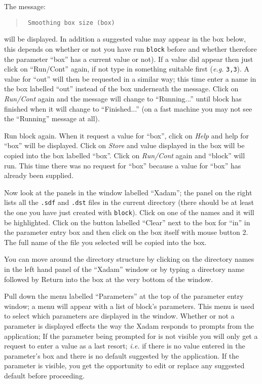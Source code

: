 \begin{list}{
}{\setlength{\rightmargin}{\leftmargin}}
The message:
\begin{quote}\tt
Smoothing box size (box)
\end{quote}

will be displayed. In addition a suggested value may appear in the box
below, this depends on whether or not you have run {\tt block} before
and whether therefore the parameter ``box'' has a current value or
not). If a value did appear then just click on ``Run/Cont'' again, if
not type in something suitable first ({\em e.g.}\/ {\tt 3,3}).  A
value for ``out'' will then be requested in a similar way; this time
enter a name in the box labelled ``out'' instead of the box underneath
the message. Click on {\em Run/Cont} again and the message will change
to ``Running...'' until block has finished when it will change to
``Finished...'' (on a fast machine you may not see the ``Running''
message at all).

\item Run block again. When it request a value for ``box'', click on
{\em Help} and help for ``box'' will be displayed. Click on {\em Store}
and value displayed in the box will be copied into the box labelled
``box''.  Click on {\em Run/Cont} again and ``block'' will run. This
time there was no request for ``box'' because a value for ``box'' has
already been supplied.

\item Now look at the panels in the window labelled ``Xadam''; the
panel on the right lists all the {\tt .sdf} and {\tt .dst} files in the
current directory (there should be at least the one you have just
created with {\tt block}).  Click on one of the names and it will be
highlighted.  Click on the button labelled ``Clear'' next to the box
for ``in'' in the parameter entry box and then click on the box itself
with mouse button 2. The full name of the file you selected will be
copied into the box.

You can move around the directory structure by clicking on the
directory names in the left hand panel of the ``Xadam'' window or by
typing a directory name followed by Return into the box at the very
bottom of the window.

\item Pull down the menu labelled ``Parameters'' at the top of the
parameter entry window; a menu will appear with a list of block's
parameters.  This menu is used to select which parameters are displayed
in the window. Whether or not a parameter is displayed effects the way
the Xadam responds to prompts from the application; If the parameter
being prompted for is not visible you will only get a request to enter
a value as a last resort; {\em i.e.}\/ if there is no value entered in
the parameter's box and there is no default suggested by the
application.  If the parameter is visible, you get the opportunity to
edit or replace any suggested default before proceeding.


\end{list}
